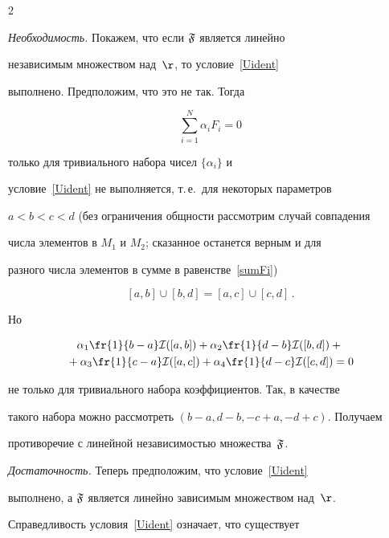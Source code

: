\begin{multicols}{2}
\smallskip



\textit{Необходимость.} Покажем, что если $\mathfrak F$ является линейно

независимым множеством над~$\r$, то условие~\eqref{Uident}

выполнено. Предположим, что это не так. Тогда

\begin{equation*}

\sum\limits_{i=1}^N \alpha_iF_i=0

\end{equation*}

только для тривиального набора чисел $\{\alpha_i\}$ и

условие~\eqref{Uident} не выполняется, т.\,е.\ для некоторых параметров

$a<b<c<d$ (без ограничения общности рассмотрим случай совпадения

числа элементов в $M_1$ и $M_2$; сказанное останется верным и для

разного числа элементов в сумме в равенстве~\eqref{sumFi})

$$

[a,b]\cup[b,d]=[a,c]\cup[c,d]\,.

$$

Но

\begin{multline*}

\alpha_1\fr{1}{b-a}\Id([a,b])+\alpha_2\fr{1}{d-b}\Id([b,d])+{}\\

{}+

\alpha_3\fr{1}{c-a}\Id([a,c])+\alpha_4\fr{1}{d-c}\Id([c,d])=0

\end{multline*}

не только для тривиального набора коэффициентов. Так, в качестве

такого набора можно рассмотреть $(b-a,d-b,-c+a,-d+c)$. Получаем

противоречие с линейной независимостью множества~$\mathfrak F$.



\smallskip



\textit{Достаточность.} Теперь предположим, что условие~\eqref{Uident}

выполнено, а $\mathfrak F$ является линейно зависимым множеством над~$\r$.

Справедливость условия~\eqref{Uident} означает, что существует


\end{multicols}
